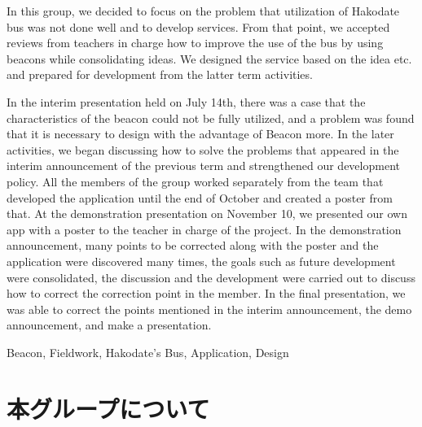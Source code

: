 \documentclass[openany,11pt,papersize]{jsbook}
\begin{document}
\begin{eabstract}

 

In this group, we decided to focus on the problem that utilization of Hakodate bus was not done well and to develop services.
From that point, we accepted reviews from teachers in charge how to improve the use of the bus by using beacons while consolidating ideas.
We designed the service based on the idea etc. and prepared for development from the latter term activities.

In the interim presentation held on July 14th, there was a case that the characteristics of the beacon could not be fully utilized, and a problem was found that it is necessary to design with the advantage of Beacon more.
In the later activities, we began discussing how to solve the problems that appeared in the interim announcement of the previous term and strengthened our development policy.
All the members of the group worked separately from the team that developed the application until the end of October and created a poster from that.
At the demonstration presentation on November 10, we presented our own app with a poster to the teacher in charge of the project.
In the demonstration announcement, many points to be corrected along with the poster and the application were discovered many times, the goals such as future development were consolidated, the discussion and the development were carried out to discuss how to correct the correction point in the member.
In the final presentation, we was able to correct the points mentioned in the interim announcement, the demo announcement, and make a presentation.

\begin{ekeyword}
Beacon, Fieldwork, Hakodate's Bus, Application, Design
\end{ekeyword}
\end{eabstract}


  \tableofcontents%


  \mainmatter%

  




  \chapter{本グループについて}
\end{document}
